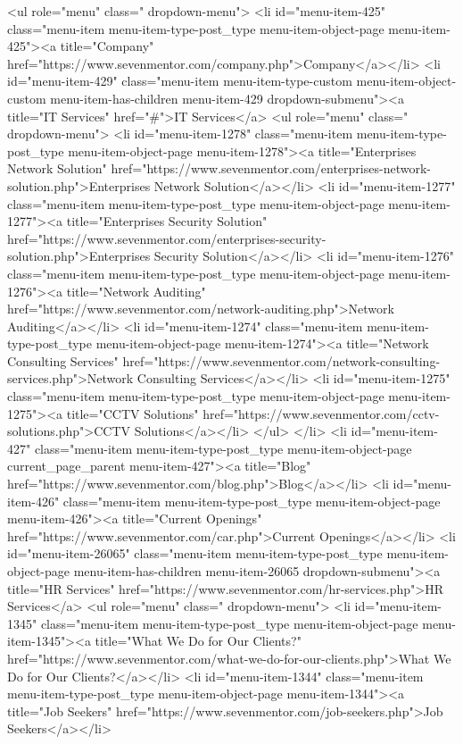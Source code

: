 {<ul role="menu" class=" dropdown-menu">
<li id="menu-item-425" class="menu-item menu-item-type-post_type menu-item-object-page menu-item-425"><a title="Company" href="https://www.sevenmentor.com/company.php">Company</a></li>
<li id="menu-item-429" class="menu-item menu-item-type-custom menu-item-object-custom menu-item-has-children menu-item-429 dropdown-submenu"><a title="IT Services" href="#">IT Services</a>
<ul role="menu" class=" dropdown-menu">
<li id="menu-item-1278" class="menu-item menu-item-type-post_type menu-item-object-page menu-item-1278"><a title="Enterprises Network Solution" href="https://www.sevenmentor.com/enterprises-network-solution.php">Enterprises Network Solution</a></li>
<li id="menu-item-1277" class="menu-item menu-item-type-post_type menu-item-object-page menu-item-1277"><a title="Enterprises Security Solution" href="https://www.sevenmentor.com/enterprises-security-solution.php">Enterprises Security Solution</a></li>
<li id="menu-item-1276" class="menu-item menu-item-type-post_type menu-item-object-page menu-item-1276"><a title="Network Auditing" href="https://www.sevenmentor.com/network-auditing.php">Network Auditing</a></li>
<li id="menu-item-1274" class="menu-item menu-item-type-post_type menu-item-object-page menu-item-1274"><a title="Network Consulting Services" href="https://www.sevenmentor.com/network-consulting-services.php">Network Consulting Services</a></li>
<li id="menu-item-1275" class="menu-item menu-item-type-post_type menu-item-object-page menu-item-1275"><a title="CCTV Solutions" href="https://www.sevenmentor.com/cctv-solutions.php">CCTV Solutions</a></li>
</ul>
</li>
<li id="menu-item-427" class="menu-item menu-item-type-post_type menu-item-object-page current_page_parent menu-item-427"><a title="Blog" href="https://www.sevenmentor.com/blog.php">Blog</a></li>
<li id="menu-item-426" class="menu-item menu-item-type-post_type menu-item-object-page menu-item-426"><a title="Current Openings" href="https://www.sevenmentor.com/car.php">Current Openings</a></li>
<li id="menu-item-26065" class="menu-item menu-item-type-post_type menu-item-object-page menu-item-has-children menu-item-26065 dropdown-submenu"><a title="HR Services" href="https://www.sevenmentor.com/hr-services.php">HR Services</a>
<ul role="menu" class=" dropdown-menu">
<li id="menu-item-1345" class="menu-item menu-item-type-post_type menu-item-object-page menu-item-1345"><a title="What We Do for Our Clients?" href="https://www.sevenmentor.com/what-we-do-for-our-clients.php">What We Do for Our Clients?</a></li>
<li id="menu-item-1344" class="menu-item menu-item-type-post_type menu-item-object-page menu-item-1344"><a title="Job Seekers" href="https://www.sevenmentor.com/job-seekers.php">Job Seekers</a></li>
}
